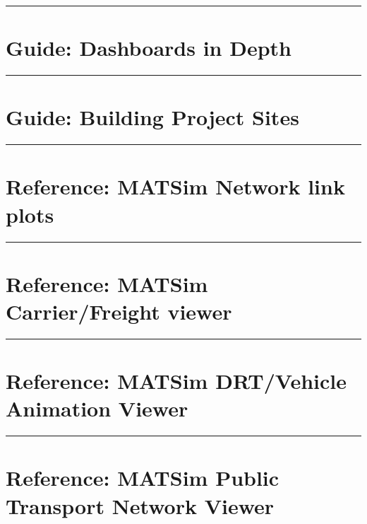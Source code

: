 \begin{center}\rule{0.5\linewidth}{0.5pt}\end{center}
\section{Guide: Dashboards in Depth}


\begin{center}\rule{0.5\linewidth}{0.5pt}\end{center}
\section{Guide: Building Project Sites}



\begin{center}\rule{0.5\linewidth}{0.5pt}\end{center}
\section{Reference: MATSim Network link plots}


\begin{center}\rule{0.5\linewidth}{0.5pt}\end{center}
\section{Reference: MATSim Carrier/Freight viewer}


\begin{center}\rule{0.5\linewidth}{0.5pt}\end{center}
\section{Reference: MATSim DRT/Vehicle Animation Viewer}


\begin{center}\rule{0.5\linewidth}{0.5pt}\end{center}
\section{Reference: MATSim Public Transport Network Viewer}



